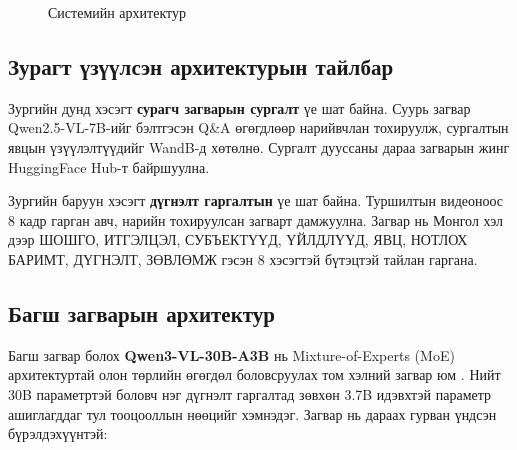\begin{figure}[H]
{%
}
\caption{Системийн архитектур}
\label{fig:system_урсгал}
\end{figure}

\subsection{Зурагт үзүүлсэн архитектурын тайлбар}

Зургийн дунд хэсэгт \textbf{сурагч загварын сургалт} үе шат байна. Суурь загвар Qwen2.5-VL-7B-ийг бэлтгэсэн Q\&A өгөгдлөөр нарийвчлан тохируулж, сургалтын явцын үзүүлэлтүүдийг WandB-д хөтөлнө. Сургалт дууссаны дараа загварын жинг HuggingFace Hub-т байршуулна.

Зургийн баруун хэсэгт \textbf{дүгнэлт гаргалтын} үе шат байна. Туршилтын видеоноос 8 кадр гарган авч, нарийн тохируулсан загварт дамжуулна. Загвар нь Монгол хэл дээр ШОШГО, ИТГЭЛЦЭЛ, СУБЪЕКТҮҮД, ҮЙЛДЛҮҮД, ЯВЦ, НОТЛОХ БАРИМТ, ДҮГНЭЛТ, ЗӨВЛӨМЖ гэсэн 8 хэсэгтэй бүтэцтэй тайлан гаргана.

\subsection{Багш загварын архитектур}

Багш загвар болох \textbf{Qwen3-VL-30B-A3B} нь Mixture-of-Experts (MoE) архитектуртай олон төрлийн өгөгдөл боловсруулах том хэлний загвар юм \cite{qwen3vl2025}. Нийт 30B параметртэй боловч нэг дүгнэлт гаргалтад зөвхөн 3.7B идэвхтэй параметр ашиглагддаг тул тооцооллын нөөцийг хэмнэдэг. Загвар нь дараах гурван үндсэн бүрэлдэхүүнтэй:

